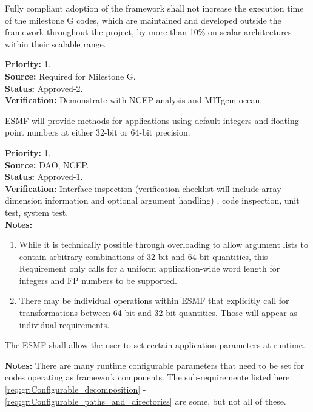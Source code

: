

 \label{perf}
Fully compliant adoption of the framework shall not increase the execution time 
of the milestone G codes, which are maintained and developed outside the 
framework throughout the project, by more than 10\% on scalar 
architectures within their scalable range.
\begin{reqlist}
{\bf Priority:} 1. \\
{\bf Source:} Required for Milestone G. \\
{\bf Status:} Approved-2. \\
{\bf Verification:} Demonstrate with NCEP analysis and MITgcm ocean.
\end{reqlist}

 ESMF will provide methods for applications using
default integers and floating-point numbers at either 32-bit or 64-bit
precision.

\begin{reqlist}
  {\bf Priority:} 1. \\
  {\bf Source:} DAO, NCEP. \\
  {\bf Status:} Approved-1. \\
  {\bf Verification:} Interface inspection (verification 
  checklist will include array dimension information and
  optional argument handling) , code inspection, unit
  test, system test. \\
  {\bf Notes:}
  \begin{enumerate}
  \item While it is technically possible through overloading to allow
    argument lists to contain arbitrary combinations of 32-bit and
    64-bit quantities, this Requirement only calls for a uniform
    application-wide word length for integers and FP numbers to be
    supported.
  \item There may be individual operations within ESMF that explicitly
    call for transformations between 64-bit and 32-bit quantities.
    Those will appear as individual requirements.
  \end{enumerate}
\end{reqlist}

 The ESMF shall allow the user to set
certain application parameters at runtime.
\begin{reqlist}
{\bf Notes:} There are many runtime configurable parameters that 
need to be set for codes operating as framework components.
The sub-requiremente listed here \ref{req:gr:Configurable_decomposition} - 
\ref{req:gr:Configurable_paths_and_directories} are some, but not all of these.
\end{reqlist}

